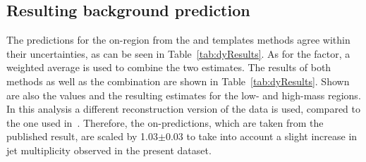 \subsection{Resulting background prediction}
The predictions for the on-\Z region from the \JZB and \MET templates methods agree within their uncertainties, as can be seen in Table~\ref{tab:dyResults}. As for the \Rsfof factor, a weighted average is used to combine the two estimates. The results of both methods as well as the combination are shown in Table~\ref{tab:dyResults}. Shown are also the \Routin values and the resulting estimates for the low- and high-mass regions. In this analysis a different reconstruction version of the data is used, compared to the one used in~\cite{Khachatryan:2015lwa}. Therefore, the on-\Z predictions, which are taken from the published result, are scaled by 1.03$\pm$0.03 to take into account a slight increase in jet multiplicity observed in the present dataset.




